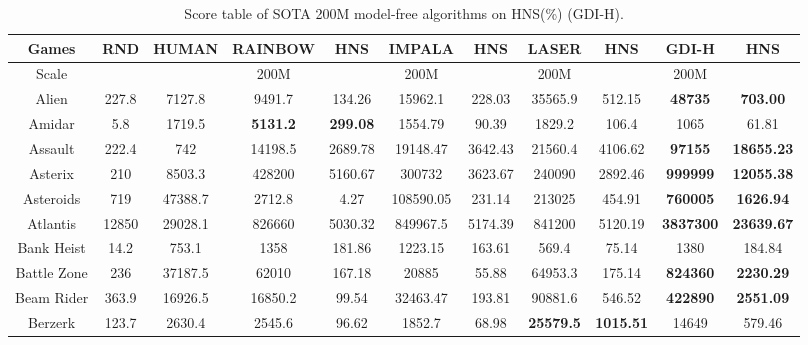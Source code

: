 \documentclass[nohyperref]{article}
\theoremstyle{plain}
\begin{document}
\begin{table}[!hb]
\footnotesize
\begin{center}
\caption{Score table of SOTA 200M model-free algorithms on HNS(\%) (GDI-H).}
\setlength{\tabcolsep}{1.0pt}
\begin{tabular}{ |c| c| c| c c| c c| c c| c c|}
\hline
Games & RND & HUMAN & RAINBOW & HNS & IMPALA & HNS & LASER & HNS  & GDI-H & HNS\\
\hline
Scale  &     &       & 200M   &       &  200M    &        & 200M   &         &  200M   &\\
\hline
 Alien  & 227.8 & 7127.8            & 9491.7 & 134.26 & 15962.1  & 228.03 & 35565.9 & 512.15                                 &\textbf{48735}             &\textbf{703.00}      \\
 Amidar & 5.8   & 1719.5            & \textbf{5131.2} & \textbf{299.08} & 1554.79  & 90.39  & 1829.2  & 106.4                 &1065                       &61.81       \\
 Assault & 222.4 & 742              & 14198.5 & 2689.78 & 19148.47 & 3642.43  & 21560.4 & 4106.62                         &\textbf{97155}             &\textbf{18655.23}    \\
 Asterix & 210   & 8503.3           & 428200 & 5160.67 & 300732   & 3623.67  & 240090  & 2892.46                          &\textbf{999999}            &\textbf{12055.38}    \\
 Asteroids & 719 & 47388.7          & 2712.8 & 4.27   & 108590.05 & 231.14  & 213025  &  454.91                          &\textbf{760005 }           &\textbf{1626.94}     \\
 Atlantis & 12850 & 29028.1         & 826660 & 5030.32 & 849967.5 & 5174.39 & 841200 & 5120.19                            &\textbf{3837300}           &\textbf{23639.67}     \\
 Bank Heist & 14.2 & 753.1          & 1358   & 181.86  & 1223.15  & 163.61  & 569.4  & 75.14                         &1380                       &184.84       \\
 Battle Zone & 236 & 37187.5        & 62010 & 167.18  & 20885    & 55.88  & 64953.3 & 175.14                                &\textbf{824360}            &\textbf{2230.29}      \\
 Beam Rider & 363.9 & 16926.5       & 16850.2 & 99.54 & 32463.47 & 193.81 & 90881.6 & 546.52                                &\textbf{422890}            &\textbf{2551.09}      \\
 Berzerk & 123.7 & 2630.4           & 2545.6   & 96.62  & 1852.7   & 68.98  & \textbf{25579.5} & \textbf{1015.51}           &14649             &579.46       \\

\end{tabular}
\end{center}
\end{table}
\end{document}
